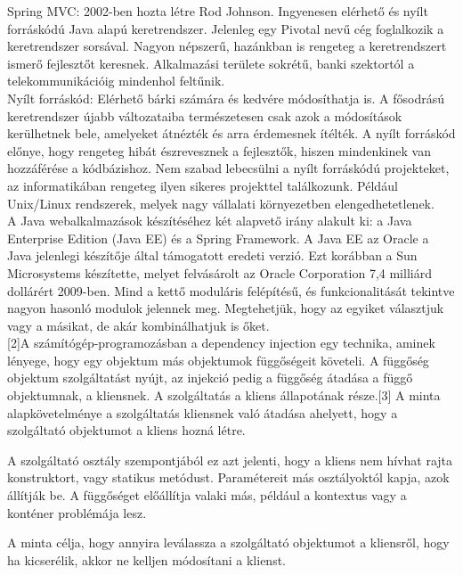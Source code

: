 \documentclass[11pt]{article}
\begin{document}
Spring MVC: 2002-ben hozta létre Rod Johnson. Ingyenesen elérhető és nyílt forráskódú Java alapú keretrendszer. Jelenleg egy Pivotal nevű cég foglalkozik a keretrendszer sorsával. Nagyon népszerű, hazánkban is rengeteg a keretrendszert ismerő fejlesztőt keresnek. Alkalmazási területe sokrétű, banki szektortól a telekommunikációig mindenhol feltűnik.\\

Nyílt forráskód: Elérhető bárki számára és kedvére módosíthatja is. A fősodrású keretrendszer újabb változataiba természetesen csak azok a módosítások kerülhetnek bele, amelyeket átnézték és arra érdemesnek ítélték. A nyílt forráskód előnye, hogy rengeteg hibát észrevesznek a fejlesztők, hiszen mindenkinek van hozzáférése a kódbázishoz. Nem szabad lebecsülni a nyílt forráskódú projekteket, az informatikában rengeteg ilyen sikeres projekttel találkozunk. Például Unix/Linux rendszerek, melyek nagy vállalati környezetben elengedhetetlenek.\\

A Java webalkalmazások készítéséhez két alapvető irány alakult ki: a Java Enterprise Edition (Java EE) és a Spring Framework. A Java EE az Oracle a Java jelenlegi készítője által támogatott eredeti verzió. Ezt korábban a Sun Microsystems készítette, melyet felvásárolt az Oracle Corporation 7,4 milliárd dollárért 2009-ben. Mind a kettő moduláris felépítésű, és funkcionalitását tekintve nagyon hasonló modulok jelennek meg. Megtehetjük, hogy az egyiket választjuk vagy a másikat, de akár kombinálhatjuk is őket.\\

[2]A számítógép-programozásban a dependency injection egy technika, aminek lényege, hogy egy objektum más objektumok függőségeit követeli. A függőség objektum szolgáltatást nyújt, az injekció pedig a függőség átadása a függő objektumnak, a kliensnek. A szolgáltatás a kliens állapotának része.[3] A minta alapkövetelménye a szolgáltatás kliensnek való átadása ahelyett, hogy a szolgáltató objektumot a kliens hozná létre.

A szolgáltató osztály szempontjából ez azt jelenti, hogy a kliens nem hívhat rajta konstruktort, vagy statikus metódust. Paramétereit más osztályoktól kapja, azok állítják be. A függőséget előállítja valaki más, például a kontextus vagy a konténer problémája lesz.

A minta célja, hogy annyira leválassza a szolgáltató objektumot a kliensről, hogy ha kicserélik, akkor ne kelljen módosítani a klienst.
\end{document}
